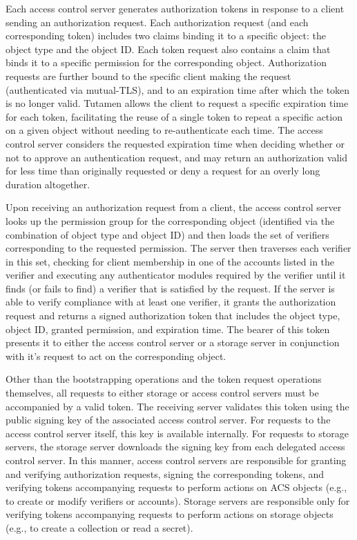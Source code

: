 Each access control server generates authorization tokens in response
to a client sending an authorization request. Each authorization
request (and each corresponding token) includes two claims binding it
to a specific object: the object type and the object ID. Each token
request also contains a claim that binds it to a specific permission
for the corresponding object. Authorization requests are further bound
to the specific client making the request (authenticated via
mutual-TLS), and to an expiration time after which the token is no
longer valid. Tutamen allows the client to request a specific
expiration time for each token, facilitating the reuse of a single
token to repeat a specific action on a given object without needing to
re-authenticate each time. The access control server considers the
requested expiration time when deciding whether or not to approve an
authentication request, and may return an authorization valid for less
time than originally requested or deny a request for an overly long
duration altogether.

Upon receiving an authorization request from a client, the access
control server looks up the permission group for the corresponding
object (identified via the combination of object type and object ID)
and then loads the set of verifiers corresponding to the requested
permission. The server then traverses each verifier in this set,
checking for client membership in one of the accounts listed in the
verifier and executing any authenticator modules required by the
verifier until it finds (or fails to find) a verifier that is
satisfied by the request. If the server is able to verify compliance
with at least one verifier, it grants the authorization request and
returns a signed authorization token that includes the object type,
object ID, granted permission, and expiration time. The bearer of this
token presents it to either the access control server or a storage
server in conjunction with it's request to act on the corresponding
object.

Other than the bootstrapping operations and the token request
operations themselves, all requests to either storage or access
control servers must be accompanied by a valid token. The receiving
server validates this token using the public signing key of the
associated access control server. For requests to the access control
server itself, this key is available internally. For requests to
storage servers, the storage server downloads the signing key from
each delegated access control server. In this manner, access control
servers are responsible for granting and verifying authorization
requests, signing the corresponding tokens, and verifying tokens
accompanying requests to perform actions on ACS objects (e.g., to
create or modify verifiers or accounts). Storage servers are
responsible only for verifying tokens accompanying requests to perform
actions on storage objects (e.g., to create a collection or read a
secret).

